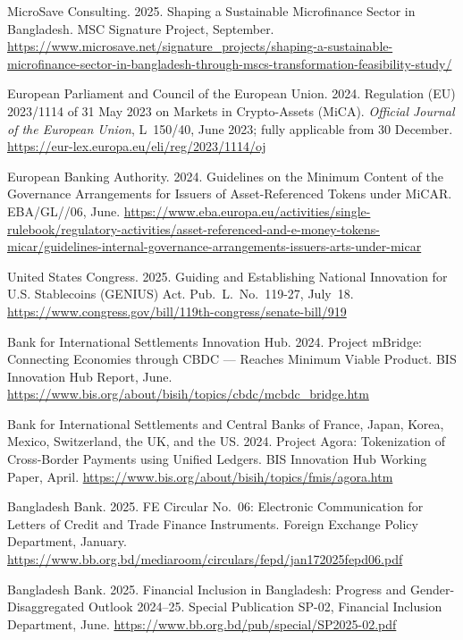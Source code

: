 \documentclass[12pt,a4paper]{report}
\begin{document}
{\begin{enumerate}[label={[\arabic*]}]
\item MicroSave Consulting. 2025. Shaping a Sustainable Microfinance Sector in Bangladesh. MSC Signature Project, September. \url{https://www.microsave.net/signature_projects/shaping-a-sustainable-microfinance-sector-in-bangladesh-through-mscs-transformation-feasibility-study/}


\item European Parliament and Council of the European Union. 2024. Regulation (EU) 2023/1114 of 31 May 2023 on Markets in Crypto-Assets (MiCA). \emph{Official Journal of the European Union}, L~150/40, June 2023; fully applicable from 30 December. \url{https://eur-lex.europa.eu/eli/reg/2023/1114/oj}


\item European Banking Authority. 2024. Guidelines on the Minimum Content of the Governance Arrangements for Issuers of Asset-Referenced Tokens under MiCAR. EBA/GL//06, June. \url{https://www.eba.europa.eu/activities/single-rulebook/regulatory-activities/asset-referenced-and-e-money-tokens-micar/guidelines-internal-governance-arrangements-issuers-arts-under-micar}


\item United States Congress. 2025. Guiding and Establishing National Innovation for U.S. Stablecoins (GENIUS) Act. Pub.~L.~No.~119-27, July~18. \url{https://www.congress.gov/bill/119th-congress/senate-bill/919}


\item Bank for International Settlements Innovation Hub. 2024. Project mBridge: Connecting Economies through CBDC --- Reaches Minimum Viable Product. BIS Innovation Hub Report, June. \url{https://www.bis.org/about/bisih/topics/cbdc/mcbdc_bridge.htm}


\item Bank for International Settlements and Central Banks of France, Japan, Korea, Mexico, Switzerland, the UK, and the US. 2024. Project Agora: Tokenization of Cross-Border Payments using Unified Ledgers. BIS Innovation Hub Working Paper, April. \url{https://www.bis.org/about/bisih/topics/fmis/agora.htm}


\item Bangladesh Bank. 2025. FE Circular No.~06: Electronic Communication for Letters of Credit and Trade Finance Instruments. Foreign Exchange Policy Department, January. \url{https://www.bb.org.bd/mediaroom/circulars/fepd/jan172025fepd06.pdf}


\item Bangladesh Bank. 2025. Financial Inclusion in Bangladesh: Progress and Gender-Disaggregated Outlook 2024--25. Special Publication SP-02, Financial Inclusion Department, June. \url{https://www.bb.org.bd/pub/special/SP2025-02.pdf}



\end{enumerate}}
\end{document}
